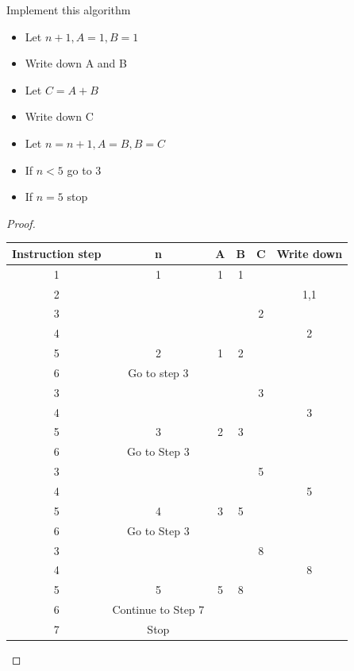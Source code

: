 \documentclass[a4paper]{article}
\begin{document}
\begin{eg}
	Implement this algorithm
	\begin{itemize}
		\item Let $n+1,A=1,B=1$
		\item Write down A and B
		\item Let $ C=A+B$
		\item Write down C
		\item Let $n=n+1,A=B,B=C$
		\item If $n<5$ go to 3
		\item If $n=5$ stop
	\end{itemize}
	\begin{proof}
		\begin{centering}
			\begin{tabular}{|c|c|c|c|c|c|}
				\hline
				Instruction step & n & A & B & C & Write down \\
				\hline
				1                & 1 & 1 & 1 &   &            \\
				\hline
				2                &   &   &   &   & 1,1        \\
				\hline
				3                &   &   &   & 2 &            \\
				\hline
				4                &   &   &   &   & 2          \\
				\hline
				5                & 2 & 1 & 2 &   &            \\
				\hline
				6 & Go to step 3& \\
				\hline
				3                &   &   &   & 3 &            \\
				\hline
				4                &   &   &   &   & 3          \\
				\hline
				5                & 3 & 2 & 3 &   &            \\
				\hline
				6 &Go to Step 3 \\
				\hline
				3                &   &   &   & 5 &            \\
				\hline
				4                &   &   &   &   & 5          \\
				\hline
				5                & 4 & 3 & 5 &   &            \\
				\hline
				6 & Go to Step 3 \\
				\hline
				3                &   &   &   & 8 &            \\
				\hline
				4                &   &   &   &   & 8          \\
				\hline
				5                & 5 & 5 & 8 &   &            \\
				\hline
				6 &Continue to Step 7\\
				\hline
				7 & Stop\\
				\hline
			\end{tabular}
		\end{centering}
	\end{proof}
\end{eg}
\end{document}
